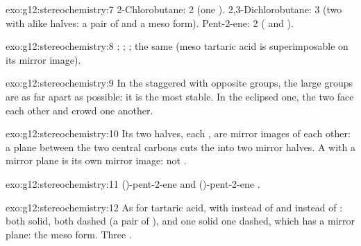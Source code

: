 \begin{solution}{exo:g12:stereochemistry:7}
2-Chlorobutane: 2 (one ). 2,3-Dichlorobutane: 3 (two
 with alike halves: a pair of  and a meso
form). Pent-2-ene: 2 ( and ).
\end{solution}

\begin{solution}{exo:g12:stereochemistry:8}
; ; ; the same  (meso
tartaric acid is superimposable on its mirror image).
\end{solution}

\begin{solution}{exo:g12:stereochemistry:9}
In the staggered  with opposite  groups, the large
groups are as far apart as possible: it is the most stable. In the
eclipsed one, the two  face each other and crowd one another.
\end{solution}

\begin{solution}{exo:g12:stereochemistry:10}
Its two halves, each , are mirror images of each other: a
plane between the two central carbons cuts the  into two mirror
halves. A  with a mirror plane is its own mirror image: not
.
\end{solution}

\begin{solution}{exo:g12:stereochemistry:11}
()-pent-2-ene 
and ()-pent-2-ene .
\end{solution}

\begin{solution}{exo:g12:stereochemistry:12}
As for tartaric acid, with  instead of  and 
instead of : both  solid, both dashed (a pair of
), and one solid one dashed, which has a mirror plane: the
meso form. Three .
\end{solution}

